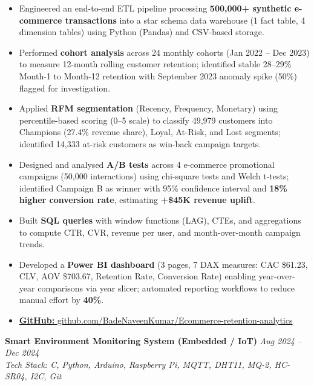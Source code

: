 \documentclass[11pt,a4paper]{article}
\newcommand{\projectheading}[3]{%
  \noindent\textbf{#1} \hfill \textit{#2} \\
  \noindent\textit{Tech Stack: #3} \\[2pt]
}
\begin{document}
\begin{itemize}
  \item Engineered an end-to-end ETL pipeline processing \textbf{500,000+ synthetic e-commerce transactions} into a
        star schema data warehouse (1 fact table, 4 dimension tables) using Python (Pandas) and CSV-based storage.
  \item Performed \textbf{cohort analysis} across 24 monthly cohorts (Jan 2022 -- Dec 2023) to measure 12-month
        rolling customer retention; identified stable 28--29\% Month-1 to Month-12 retention with September 2023
        anomaly spike (50\%) flagged for investigation.
  \item Applied \textbf{RFM segmentation} (Recency, Frequency, Monetary) using percentile-based scoring (0--5 scale)
        to classify 49,979 customers into Champions (27.4\% revenue share), Loyal, At-Risk, and Lost segments;
        identified 14,333 at-risk customers as win-back campaign targets.
  \item Designed and analysed \textbf{A/B tests} across 4 e-commerce promotional campaigns (50,000 interactions)
        using chi-square tests and Welch t-tests; identified Campaign B as winner with 95\% confidence interval
        and \textbf{18\% higher conversion rate}, estimating \textbf{+\$45K revenue uplift}.
  \item Built \textbf{SQL queries} with window functions (LAG), CTEs, and aggregations to compute CTR, CVR,
        revenue per user, and month-over-month campaign trends.
  \item Developed a \textbf{Power BI dashboard} (3 pages, 7 DAX measures: CAC \$61.23, CLV, AOV \$703.67,
        Retention Rate, Conversion Rate) enabling year-over-year comparisons via year slicer; automated
        reporting workflows to reduce manual effort by \textbf{40\%}.
  \item \href{https://github.com/BadeNaveenKumar/Ecommerce-retention-analytics}
        {\textbf{GitHub:} github.com/BadeNaveenKumar/Ecommerce-retention-analytics}
\end{itemize}

\vspace{4pt}

\projectheading
  {Smart Environment Monitoring System (Embedded / IoT)}
  {Aug 2024 -- Dec 2024}
  {C, Python, Arduino, Raspberry Pi, MQTT, DHT11, MQ-2, HC-SR04, I2C, Git}
\end{document}
